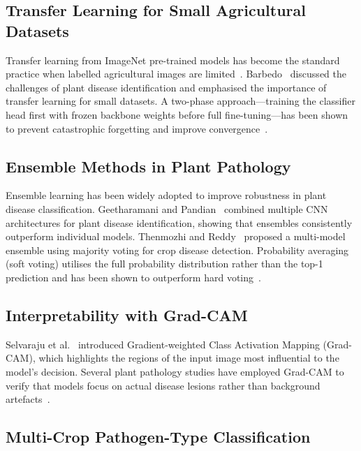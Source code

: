\documentclass[conference]{IEEEtran}
\begin{document}
\subsection{Transfer Learning for Small Agricultural Datasets}

Transfer learning from ImageNet pre-trained models has become the standard practice when labelled agricultural images are limited~\cite{pan2010survey}. Barbedo~\cite{barbedo2018impact} discussed the challenges of plant disease identification and emphasised the importance of transfer learning for small datasets. A two-phase approach---training the classifier head first with frozen backbone weights before full fine-tuning---has been shown to prevent catastrophic forgetting and improve convergence~\cite{yosinski2014transferable,razavian2014cnn}.

\subsection{Ensemble Methods in Plant Pathology}

Ensemble learning has been widely adopted to improve robustness in plant disease classification. Geetharamani and Pandian~\cite{geetharamani2019identification} combined multiple CNN architectures for plant disease identification, showing that ensembles consistently outperform individual models. Thenmozhi and Reddy~\cite{thenmozhi2019crop} proposed a multi-model ensemble using majority voting for crop disease detection. Probability averaging (soft voting) utilises the full probability distribution rather than the top-1 prediction and has been shown to outperform hard voting~\cite{kittler1998combining,ju2018relative}.

\subsection{Interpretability with Grad-CAM}

Selvaraju et al.~\cite{selvaraju2017gradcam} introduced Gradient-weighted Class Activation Mapping (Grad-CAM), which highlights the regions of the input image most influential to the model's decision. Several plant pathology studies have employed Grad-CAM to verify that models focus on actual disease lesions rather than background artefacts~\cite{jiang2019realtime,brahimi2018deep}.

\subsection{Multi-Crop Pathogen-Type Classification}
\end{document}
